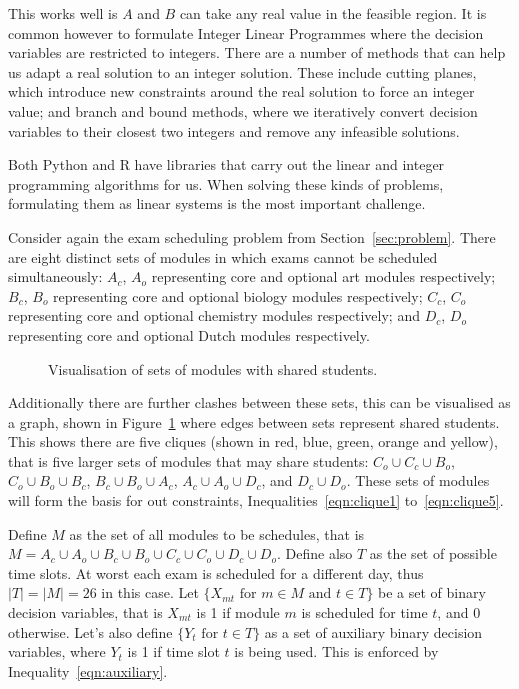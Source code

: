 This works well is $A$ and $B$ can take any real value in the feasible region.
It is common however to formulate Integer Linear Programmes where the decision
variables are restricted to integers. There are a number of methods that can
help us adapt a real solution to an integer solution. These include cutting
planes, which introduce new constraints around the real solution to force an
integer value; and branch and bound methods, where we iteratively convert
decision variables to their closest two integers and remove any infeasible
solutions.

Both Python and R have libraries that carry out the linear and integer
programming algorithms for us. When solving these kinds of problems, formulating
them as linear systems is the most important challenge.

Consider again the exam scheduling problem from Section~\ref{sec:problem}.
There are eight distinct sets of modules in which exams cannot be scheduled
simultaneously: $A_c$, $A_o$ representing core and optional art modules
respectively; $B_c$, $B_o$ representing core and optional biology modules
respectively; $C_c$, $C_o$ representing core and optional chemistry modules
respectively; and $D_c$, $D_o$ representing core and optional Dutch modules
respectively.

\begin{figure}
\begin{center}

\end{center}
\caption{Visualisation of sets of modules with shared students.}
\label{fig:clashes}
\end{figure}

Additionally there are further clashes between these sets, this can be
visualised as a graph, shown in Figure~\ref{fig:clashes} where edges between
sets represent shared students.
This shows there are five cliques (shown in red, blue, green, orange and
yellow), that is five larger sets of modules that may share students:
$C_o \cup C_c \cup B_o$, $C_o \cup B_o \cup B_c$, $B_c \cup B_o \cup A_c$,
$A_c \cup A_o \cup D_c$, and $D_c \cup D_o$. These sets of modules will form the
basis for out constraints, Inequalities~\ref{eqn:clique1} to~\ref{eqn:clique5}.

Define $M$ as the set of all modules to be schedules, that is
$M = A_c \cup A_o \cup B_c \cup B_o \cup C_c \cup C_o \cup D_c \cup D_o$.
Define also $T$ as the set of possible time slots. At worst each exam is
scheduled for a different day, thus $|T| = |M| = 26$ in this case.
Let $\{X_{mt} \text{ for } m \in M \text{ and } t \in T\}$ be a set of binary
decision variables, that is $X_{mt}$ is 1 if module $m$ is scheduled for time
$t$, and 0 otherwise.
Let's also define $\{Y_t \text{ for } t \in T\}$ as a set of auxiliary binary
decision variables, where $Y_t$ is 1 if time slot $t$ is being used. This is
enforced by Inequality~\ref{eqn:auxiliary}.

